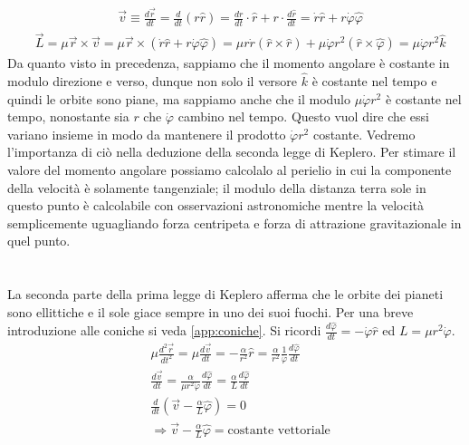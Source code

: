 \documentclass[10pt,a4paper]{article}
\begin{document}
\begin{align}\label{eq:velocitàgravitazionale}
&\vec{v} \equiv\frac{d\vec{r}}{dt}=\frac{d}{dt}(r\hat{r})=\frac{dr}{dt}\cdot \hat{r} + r\cdot \frac{d\hat{r}}{dt} = \dot{r}\hat{r} + r\dot{\varphi}\hat{\varphi}
\end{align}
\begin{align}\label{eq:momentoangolaregravitazionale}
&\vec{L} = \mu\vec{r} \times \vec{v} = \mu \vec{r} \times (\dot{r}\hat{r}+r\dot{\varphi}\hat{\varphi})=\mu r\dot{r}(\hat{r}\times\hat{r})+ \mu\dot{\varphi}r^2(\hat{r}\times\hat{\varphi}) = \mu\dot{\varphi}r^2 \hat{k} 
\end{align}
Da quanto visto in precedenza, sappiamo che il momento angolare è costante in modulo direzione e verso, dunque non solo il versore $\hat{k}$ è costante nel tempo e quindi le orbite sono piane, ma sappiamo anche che il modulo $\mu\dot{\varphi}r^2$ è costante nel tempo, nonostante sia $r$ che $\dot{\varphi}$ cambino nel tempo. Questo vuol dire che essi variano insieme in modo da mantenere il prodotto $\dot{\varphi}r^2$ costante. Vedremo l'importanza di ciò nella deduzione della seconda legge di Keplero. Per stimare il valore del momento angolare possiamo calcolalo al perielio in cui la componente della velocità è solamente tangenziale; il modulo della distanza terra sole in questo punto è calcolabile con osservazioni astronomiche mentre la velocità semplicemente uguagliando forza centripeta e forza di attrazione gravitazionale in quel punto. \\\\\\
La seconda parte della prima legge di Keplero afferma che le orbite dei pianeti sono ellittiche e il sole giace sempre in uno dei suoi fuochi. Per una breve introduzione alle coniche si veda \ref{app:coniche}. Si ricordi  $\frac{d\hat{\varphi}}{dt} = -\dot{\varphi}\hat{r}$ ed $L = \mu r^2 \dot{\varphi}$.
\begin{align*}
	&\mu\frac{d^2\vec{r}}{dt^2} = \mu\frac{d\vec{v}}{dt} = -\frac{\alpha}{r^2}\hat{r} = \frac{\alpha}{r^2}\frac{1}{\dot{\varphi}} \frac{d\hat{\varphi}}{dt}\\ &\frac{d\vec{v}}{dt} = \frac{\alpha}{\mu r^2\dot{\varphi}} \frac{d\hat{\varphi}}{dt}= \frac{\alpha}{L}\frac{d\hat{\varphi}}{dt}\\
	&\frac{d}{dt}(\vec{v}-\frac{\alpha}{L}\hat{\varphi}) = 0 \\
	& \Rightarrow \vec{v}-\frac{\alpha}{L}\hat{\varphi} = \text{costante vettoriale}
\end{align*}
\end{document}
